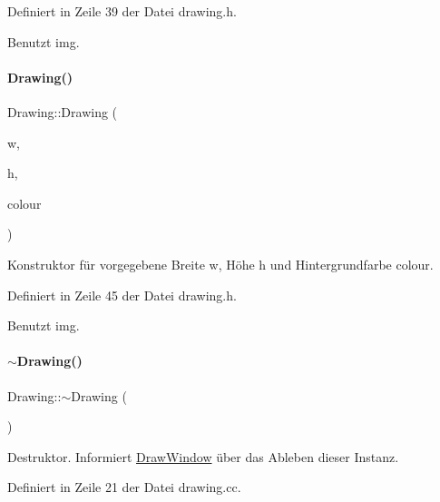 Definiert in Zeile 39 der Datei drawing.\+h.



Benutzt img.

\mbox{\label{classDrawing_a3bbc5afdee11ef4fb66bfa1a8b4d0e22}} 
\paragraph{\texorpdfstring{Drawing()}{Drawing()}\hspace{0.1cm}{\footnotesize\ttfamily [4/4]}}
{\footnotesize\ttfamily Drawing\+::\+Drawing (\begin{DoxyParamCaption}\item[{int}]{w,  }\item[{int}]{h,  }\item[{const \mbox{\hyperlink{classDrawColour}{Draw\+Colour}} \&}]{colour }\end{DoxyParamCaption})\hspace{0.3cm}{\ttfamily [inline]}}



Konstruktor für vorgegebene Breite {\ttfamily w}, Höhe {\ttfamily h} und Hintergrundfarbe {\ttfamily colour}. 



Definiert in Zeile 45 der Datei drawing.\+h.



Benutzt img.

\mbox{\label{classDrawing_a704a4be87976fca2f8b175a4aa257e9d}} 
\paragraph{\texorpdfstring{$\sim$\+Drawing()}{~Drawing()}}
{\footnotesize\ttfamily Drawing\+::$\sim$\+Drawing (\begin{DoxyParamCaption}{ }\end{DoxyParamCaption})}



Destruktor. Informiert \mbox{\hyperlink{classDrawWindow}{Draw\+Window}} über das Ableben dieser Instanz. 



Definiert in Zeile 21 der Datei drawing.\+cc.



